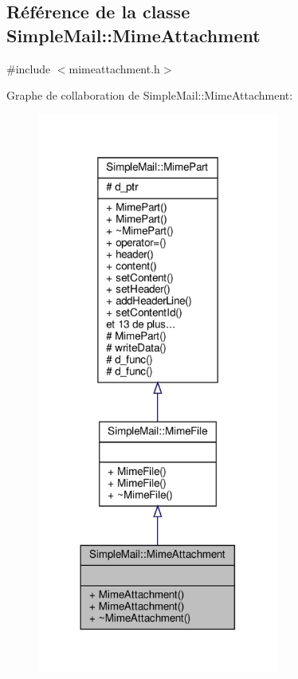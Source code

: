 \hypertarget{class_simple_mail_1_1_mime_attachment}{}\subsection{Référence de la classe Simple\+Mail\+:\+:Mime\+Attachment}
\label{class_simple_mail_1_1_mime_attachment}


{\ttfamily \#include $<$mimeattachment.\+h$>$}



Graphe de collaboration de Simple\+Mail\+:\+:Mime\+Attachment\+:\nopagebreak
\begin{figure}[H]
\begin{center}
\leavevmode
\includegraphics[width=225pt]{class_simple_mail_1_1_mime_attachment__coll__graph}
\end{center}
\end{figure}

